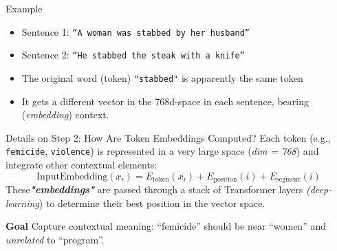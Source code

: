 \documentclass[xcolor=x11names,  aspectratio=169, compress]{beamer}
\renewcommand{\(}{\begin{columns}}
\renewcommand{\)}{\end{columns}}
\newcommand{\<}[1]{\begin{column}{#1}}
\renewcommand{\>}{\end{column}}
\begin{document}
\begin{frame}{Example}
\begin{itemize}
    \item[] Sentence 1:  \texttt{“A woman was stabbed by her husband”}
    \item[] Sentence 2:   \texttt{“He stabbed the steak with a knife”}
    \item The original word (token) \texttt{"stabbed"} is apparently the same token
    \item It gets a different vector in the 768d-space in each sentence, bearing (\textit{embedding}) context.
\end{itemize}
 \centering
{}
\end{frame}

\begin{frame}{Details on Step 2: How Are Token Embeddings Computed?}
  Each token (e.g., \texttt{femicide}, \texttt{violence}) is represented in a very large space (\textit{dim = 768}) and integrate other contextual elements:
  \[
  \text{InputEmbedding}(x_i) =
  E_{\text{token}}(x_i) + E_{\text{position}}(i) + E_{\text{segment}}(i)
  \]
  These\textit{\textbf{"embeddings"}} are passed through a stack of Transformer layers \textit{(deep-learning}) to determine their best position in the vector space.
  
  \vspace{0.4cm}
  \begin{block}{\textbf{Goal}}
  Capture contextual meaning: “femicide” should be near “women” and \textit{unrelated} to “program”.
  \end{block}
\end{frame}
\end{document}
